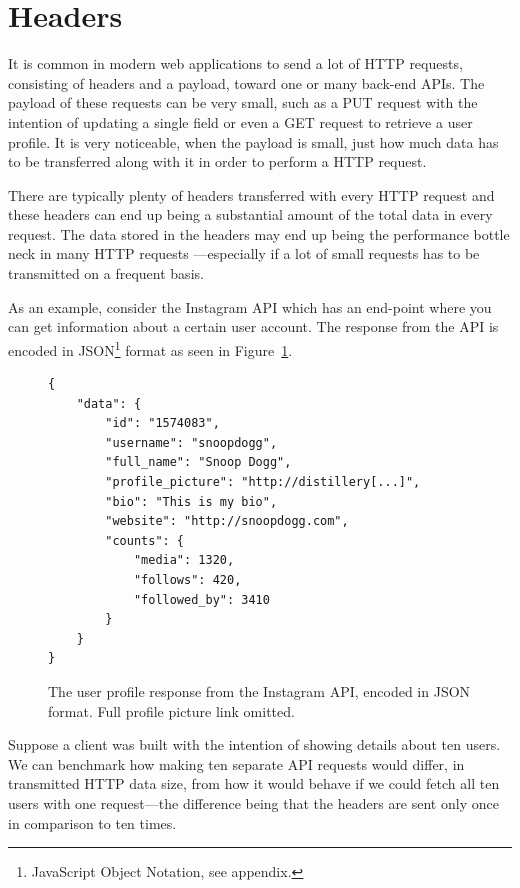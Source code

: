 \documentclass{cslthse-msc}
\begin{document}
\section{Headers}
\label{headers}

It is common in modern web applications to send a lot of HTTP requests, consisting of headers and a payload, toward one or many back-end APIs. The payload of these requests can be very small, such as a PUT request with the intention of updating a single field or even a GET request to retrieve a user profile. It is very noticeable, when the payload is small, just how much data has to be transferred along with it in order to perform a HTTP request.

There are typically plenty of headers transferred with every HTTP request and these headers can end up being a substantial amount of the total data in every request. The data stored in the headers may end up being the performance bottle neck in many HTTP requests \cite{rfc6202}---especially if a lot of small requests has to be transmitted on a frequent basis.

As an example, consider the Instagram API \cite{instagram_api} which has an end-point where you can get information about a certain user account. The response from the API is encoded in JSON\footnote{JavaScript Object Notation, see appendix.} format as seen in Figure~\ref{fig:user_json}.

\begin{figure}[H]
  \centering
\begin{lstlisting}
{
    "data": {
        "id": "1574083",
        "username": "snoopdogg",
        "full_name": "Snoop Dogg",
        "profile_picture": "http://distillery[...]",
        "bio": "This is my bio",
        "website": "http://snoopdogg.com",
        "counts": {
            "media": 1320,
            "follows": 420,
            "followed_by": 3410
        }
    }
}
\end{lstlisting}
  \caption{The user profile response from the Instagram API, encoded in JSON format. Full profile picture link omitted.}
  \label{fig:user_json}
\end{figure}

\clearpage

Suppose a client was built with the intention of showing details about ten users. We can benchmark how making ten separate API requests would differ, in transmitted HTTP data size, from how it would behave if we could fetch all ten users with one request---the difference being that the headers are sent only once in comparison to ten times.
\end{document}
